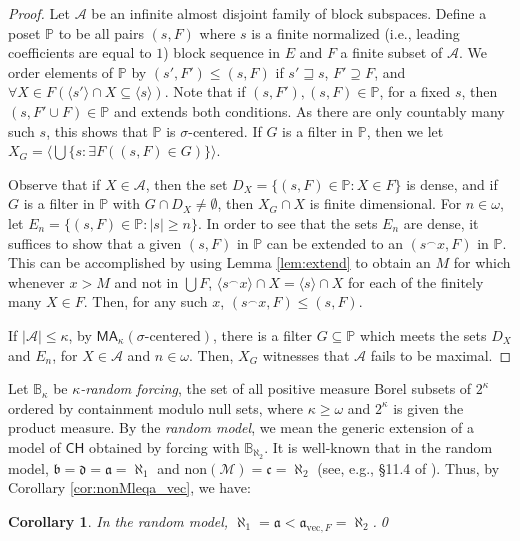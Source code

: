 \documentclass[11pt]{amsart}
\newcommand{\B}{\mathbb{B}}
\renewcommand{\P}{\mathbb{P}}
\newcommand{\LM}{\mathcal{M}}
\newcommand{\LA}{\mathcal{A}}
\renewcommand{\b}{\mathfrak{b}}
\renewcommand{\d}{\mathfrak{d}}
\renewcommand{\a}{\mathfrak{a}}
\renewcommand{\c}{\mathfrak{c}}
\newtheorem{cor}[thm]{Corollary}
\theoremstyle{definition}
\theoremstyle{remark}
\newcommand{\concat}{^\smallfrown}
\newcommand{\CH}{\mathsf{CH}}
\newcommand{\MA}{\mathsf{MA}}
\renewcommand{\P}{\mathbb{P}}
\renewcommand{\1}{\mathbf{1}}
\begin{document}
\begin{proof}
	Let $\LA$ be an infinite almost disjoint family of block subspaces. Define a poset $\P$ to be all pairs $(s,F)$ where $s$ is a finite normalized (i.e., leading coefficients are equal to $1$) block sequence in $E$ and $F$ a finite subset of $\LA$. We order elements of $\P$ by $(s',F')\leq(s,F)$ if $s'\sqsupseteq s$, $F'\supseteq F$, and $\forall X\in F(\langle s'\rangle\cap X\subseteq\langle s\rangle)$. Note that if $(s,F'),(s,F)\in\P$, for a fixed $s$, then $(s,F'\cup F)\in\P$ and extends both conditions. As there are only countably many such $s$, this shows that $\P$ is $\sigma$-centered. If $G$ is a filter in $\P$, then we let $X_G=\langle\bigcup\{s:\exists F((s,F)\in G)\}\rangle$.
	
	Observe that if $X\in\LA$, then the set $D_X=\{(s,F)\in\P:X\in F\}$ is dense, and if $G$ is a filter in $\P$ with $G\cap D_X\neq\emptyset$, then $X_G\cap X$ is finite dimensional. For $n\in\omega$, let $E_n=\{(s,F)\in\P:|s|\geq n\}$. In order to see that the sets $E_n$ are dense, it suffices to show that a given $(s,F)$ in $\P$ can be extended to an $(s\concat x,F)$ in $\P$. This can be accomplished by using Lemma \ref{lem:extend} to obtain an $M$ for which whenever $x>M$ and not in $\bigcup F$, $\langle s\concat x\rangle\cap X=\langle s\rangle\cap X$ for each of the finitely many $X\in F$. Then, for any such $x$, $(s\concat x,F)\leq(s,F)$.

	If $|\LA|\leq\kappa$, by $\MA_\kappa(\sigma\text{-centered})$, there is a filter $G\subseteq\P$ which meets the sets $D_X$ and $E_n$, for $X\in\LA$ and $n\in\omega$. Then, $X_G$ witnesses that $\LA$ fails to be maximal.
\end{proof}

Let $\B_\kappa$ be \emph{$\kappa$-random forcing}, the set of all positive measure Borel subsets of $2^\kappa$ ordered by containment modulo null sets, where $\kappa\geq\omega$ and $2^\kappa$ is given the product measure. By the \emph{random model}, we mean the generic extension of a model of $\CH$ obtained by forcing with $\B_{\aleph_2}$. It is well-known that in the random model, $\b=\d=\a=\aleph_1$ and $\mathrm{non}(\LM)=\c=\aleph_2$ (see, e.g., \S 11.4 of \cite{MR2768685}). Thus, by Corollary \ref{cor:nonMleqa_vec}, we have:

\begin{cor}\label{cor:a<a_vec}
	In the random model, $\aleph_1=\a<\a_{\mathrm{vec},F}=\aleph_2$.\qed
\end{cor}
\end{document}
